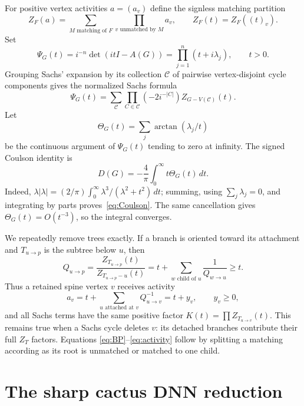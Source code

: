 \documentclass[11pt]{article}
\theoremstyle{remark}
\begin{document}
For positive vertex activities $a=(a_v)$ define the signless matching
partition
\begin{equation}\label{eq:Z}
 Z_F(a)=\sum_{M\text{ matching of }F}\prod_{v\text{ unmatched by }M}a_v,
 \qquad Z_F(t)=Z_F((t)_v).
\end{equation}
Set
\begin{equation}\label{eq:Psi}
 \Psi_G(t)=i^{-n}\det(itI-A(G))
 =\prod_{j=1}^n(t+i\lambda_j),\qquad t>0.
\end{equation}
Grouping Sachs' expansion by its collection $\mathcal C$ of pairwise
vertex-disjoint cycle components gives the normalized Sachs formula
\begin{equation}\label{eq:Sachs}
 \Psi_G(t)=\sum_{\mathcal C}
 \prod_{C\in\mathcal C}(-2i^{-|C|})
 Z_{G-V(\mathcal C)}(t).
\end{equation}
Let
\[
 \Theta_G(t)=\sum_j\arctan(\lambda_j/t)
\]
be the continuous argument of $\Psi_G(t)$ tending to zero at infinity.  The
signed Coulson identity is
\begin{equation}\label{eq:Coulson}
 D(G)=-\frac4\pi\int_0^\infty t\Theta_G(t)\,dt.
\end{equation}
Indeed, $\lambda|\lambda|=(2/\pi)\int_0^\infty
\lambda^3/(\lambda^2+t^2)\,dt$; summing, using $\sum_j\lambda_j=0$, and
integrating by parts proves~\eqref{eq:Coulson}.  The same cancellation gives
$\Theta_G(t)=O(t^{-3})$, so the integral converges.

We repeatedly remove trees exactly.  If a branch is oriented toward its
attachment and $T_{u\to p}$ is the subtree below $u$, then
\begin{equation}\label{eq:BP}
 Q_{u\to p}=\frac{Z_{T_{u\to p}}(t)}{Z_{T_{u\to p}-u}(t)}
 =t+\sum_{w\text{ child of }u}\frac1{Q_{w\to u}}\geq t.
\end{equation}
Thus a retained spine vertex $v$ receives activity
\begin{equation}\label{eq:activity}
 a_v=t+\sum_{u\text{ attached at }v}Q_{u\to v}^{-1}=t+y_v,
 \qquad y_v\geq0,
\end{equation}
and all Sachs terms have the same positive factor $K(t)=\prod Z_{T_{u\to
v}}(t)$.  This remains true when a Sachs cycle deletes $v$: its detached
branches contribute their full $Z_T$ factors.  Equations
\eqref{eq:BP}--\eqref{eq:activity} follow by splitting a matching according
as its root is unmatched or matched to one child.

\section{The sharp cactus DNN reduction}
\end{document}
